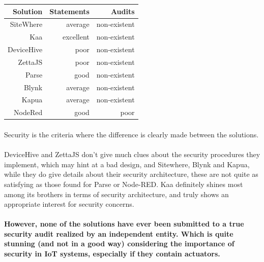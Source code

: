 \documentclass{article}
\begin{document}
\begin{center}
\begin{tabular}{r|r|r}
Solution & Statements & Audits \\ \hline
SiteWhere & \cellcolor{yellow!25}average & \cellcolor{red!25}non-existent \\
Kaa & \cellcolor{green!25}excellent & \cellcolor{red!25}non-existent \\
DeviceHive & \cellcolor{orange!25}poor & \cellcolor{red!25}non-existent \\
ZettaJS & \cellcolor{orange!25}poor & \cellcolor{red!25}non-existent \\
Parse & \cellcolor{blue!10}good & \cellcolor{red!25}non-existent \\
Blynk & \cellcolor{yellow!25}average & \cellcolor{red!25}non-existent \\
Kapua & \cellcolor{yellow!25}average & \cellcolor{red!25}non-existent \\
NodeRed & \cellcolor{blue!10}good & \cellcolor{orange!25}poor \\
\end{tabular}
\end{center}

\paragraph{} Security is the criteria where the difference is clearly made between the solutions.

\paragraph{} DeviceHive and ZettaJS don't give much clues about the security procedures they implement, which may hint at a bad design, and Sitewhere, Blynk and Kapua, while they do give details about their security architecture, these are not quite as satisfying as those found for Parse or Node-RED. Kaa definitely shines most among its brothers in terms of security architecture, and truly shows an appropriate interest for security concerns.

\paragraph{} \textbf{However, none of the solutions have ever been submitted to a true security audit realized by an independent entity. Which is quite stunning (and not in a good way) considering the importance of security in IoT systems, especially if they contain actuators.}
\end{document}
